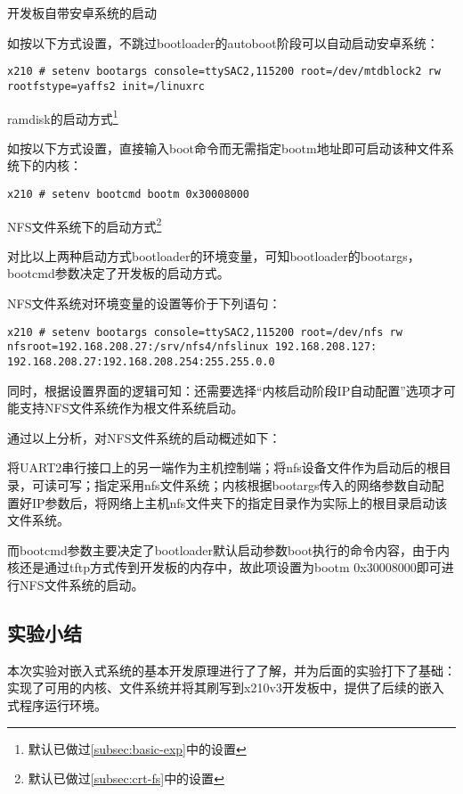 \documentclass[hyperref,UTF8]{ctexart}
\begin{document}
\begin{enumerate}
\item {开发板自带安卓系统的启动

如按以下方式设置，不跳过bootloader的autoboot阶段可以自动启动安卓系统：
\begin{Verbatim}[frame=single]
x210 # setenv bootargs console=ttySAC2,115200 root=/dev/mtdblock2 rw
rootfstype=yaffs2 init=/linuxrc
\end{Verbatim}
\item ramdisk的启动方式\footnote{默认已做过\ref{subsec:basic-exp}中的设置}

如按以下方式设置，直接输入boot命令而无需指定bootm地址即可启动该种文件系统下的内核：
\begin{Verbatim}[frame=single]
x210 # setenv bootcmd bootm 0x30008000
\end{Verbatim}
}
\item NFS文件系统下的启动方式\footnote{默认已做过\ref{subsec:crt-fs}中的设置}

对比以上两种启动方式bootloader的环境变量，可知bootloader的bootargs，bootcmd参数决定了开发板的启动方式。

NFS文件系统对环境变量的设置等价于下列语句：
\begin{Verbatim}[frame=single]
x210 # setenv bootargs console=ttySAC2,115200 root=/dev/nfs rw
nfsroot=192.168.208.27:/srv/nfs4/nfslinux 192.168.208.127:
192.168.208.27:192.168.208.254:255.255.0.0
\end{Verbatim}

同时，根据设置界面的逻辑可知：还需要选择“内核启动阶段IP自动配置”选项才可能支持NFS文件系统作为根文件系统启动。
\end{enumerate}

通过以上分析，对NFS文件系统的启动概述如下：

将UART2串行接口上的另一端作为主机控制端；将nfs设备文件作为启动后的根目录，可读可写；指定采用nfs文件系统；内核根据bootargs传入的网络参数自动配置好IP参数后，将网络上主机nfs文件夹下的指定目录作为实际上的根目录启动该文件系统。

而bootcmd参数主要决定了bootloader默认启动参数boot执行的命令内容，由于内核还是通过tftp方式传到开发板的内存中，故此项设置为bootm 0x30008000即可进行NFS文件系统的启动。

\subsection{实验小结}
本次实验对嵌入式系统的基本开发原理进行了了解，并为后面的实验打下了基础：实现了可用的内核、文件系统并将其刷写到x210v3开发板中，提供了后续的嵌入式程序运行环境。
\end{document}

